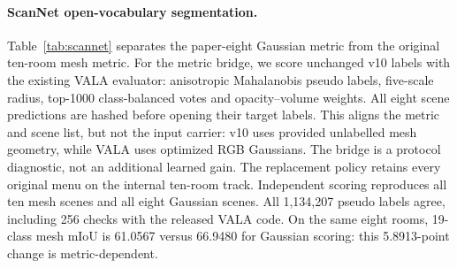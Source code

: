 \begin{table}[ht]
\centering\small
\caption{LERF-2D. P values are reported in VALA Table 1~\cite{vala}.
Localization is peak-in-box accuracy, not ranking AP. O uses source-assisted
full teachers; these are v10 method results, not new replacement gains.}
\label{tab:lerf2d}
\end{table}
\begin{table}[ht]
\centering\small
\caption{LERF selected-Gaussian projection. P values are reported in VALA
Table 1~\cite{vala}; Acc.@0.25 counts projected masks with IoU above 0.25.
VALA's published value is 58.02/82.85; 43.29/64.30 belongs to Dr. Splat.
The local VALA R row uses compatible RGB geometry.}
\label{tab:lerf3d}
\end{table}

\paragraph{ScanNet open-vocabulary segmentation.}
Table~\ref{tab:scannet} separates the paper-eight Gaussian metric from the
original ten-room mesh metric. For the metric bridge, we score unchanged v10
labels with the existing VALA evaluator: anisotropic Mahalanobis pseudo labels,
five-scale radius, top-1000 class-balanced votes and opacity--volume weights.
All eight scene predictions are hashed before opening their target labels.
This aligns the metric and scene list, but not the input carrier: v10 uses
provided unlabelled mesh geometry, while VALA uses optimized RGB Gaussians.
The bridge is a protocol diagnostic, not an additional learned gain. The
replacement policy retains every original menu on the internal ten-room track.
Independent scoring reproduces all ten mesh scenes and all eight Gaussian
scenes. All 1,134,207 pseudo labels agree, including 256 checks with the released
VALA code. On the same eight rooms, 19-class mesh mIoU is 61.0567 versus
66.9480 for Gaussian scoring: this 5.8913-point change is metric-dependent.

\begin{table}[ht]
\centering\small
\resizebox{\linewidth}{!}{}
\caption{ScanNet OVS. P rows from VALA Table 2~\cite{vala}, R and the metric
bridge use paper8 Gaussian scoring. Rows marked 10-mesh use the original
ten-room mesh evaluation and cannot be ranked against the paper8 rows.
The metric bridge still differs in geometry and teacher access.}
\label{tab:scannet}
\end{table}

